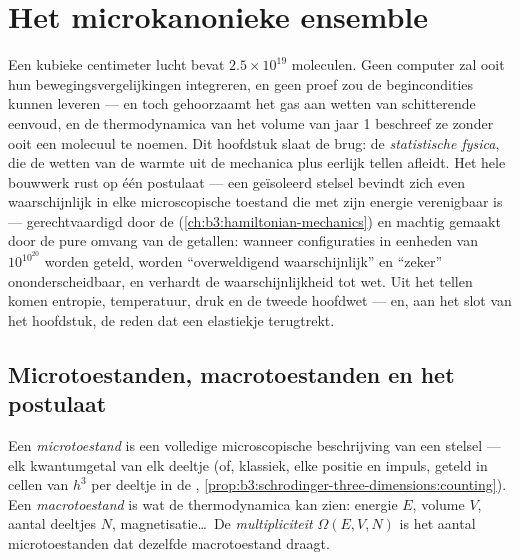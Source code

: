 \chapter{Het microkanonieke ensemble}\label{ch:b3:microcanonical-ensemble}

Een kubieke centimeter lucht bevat $2.5\times10^{19}$ moleculen. Geen
computer zal ooit hun bewegingsvergelijkingen integreren, en geen proef zou
de begincondities kunnen leveren --- en toch gehoorzaamt het gas aan wetten
van schitterende eenvoud, en de thermodynamica van het volume van jaar 1
beschreef ze zonder ooit een molecuul te noemen. Dit hoofdstuk slaat de
brug: de \emph{statistische fysica}, die de wetten van de warmte uit de
mechanica plus eerlijk tellen afleidt. Het hele bouwwerk rust op één
postulaat --- een geïsoleerd stelsel bevindt zich even waarschijnlijk in
elke microscopische toestand die met zijn energie verenigbaar is ---
gerechtvaardigd door de 
(\cref{ch:b3:hamiltonian-mechanics}) en machtig gemaakt door de pure
omvang van de getallen: wanneer configuraties in eenheden van
$10^{10^{20}}$ worden geteld, worden ``overweldigend waarschijnlijk'' en
``zeker'' ononderscheidbaar, en verhardt de waarschijnlijkheid tot wet. Uit
het tellen komen entropie, temperatuur, druk en de tweede hoofdwet ---
en, aan het slot van het hoofdstuk, de reden dat een elastiekje terugtrekt.

\section{Microtoestanden, macrotoestanden en het postulaat}

\begin{definition}\label{def:b3:microcanonical-ensemble:states}
Een \emph{microtoestand} is een volledige microscopische beschrijving van
een stelsel --- elk kwantumgetal van elk deeltje (of, klassiek, elke
positie en impuls, geteld in cellen van $h^3$ per deeltje in de
, \cref{prop:b3:schrodinger-three-dimensions:counting}). Een
\emph{macrotoestand} is wat de thermodynamica kan zien: energie $E$, volume
$V$, aantal deeltjes $N$, magnetisatie\dots\ De \emph{multipliciteit}
$\Omega(E, V, N)$ is het aantal microtoestanden dat dezelfde macrotoestand
draagt.
\end{definition}

